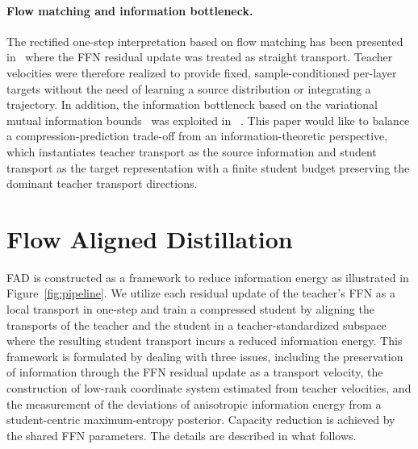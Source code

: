 \documentclass[letterpaper]{article} %
\theoremstyle{plain}
\theoremstyle{definition}
\begin{document}
\paragraph{Flow matching and information bottleneck.}
The rectified one-step {interpretation} based on flow matching has been presented in~\citep{chen2018neuralode,lipman2023flowmatching,liu2023rectified} where the FFN residual update was treated as straight transport. Teacher velocities were therefore realized to provide fixed, sample-conditioned per-layer targets without the need of learning a source distribution or integrating a trajectory. In addition, the information bottleneck based on the variational mutual information bounds~\citep{barber2003im,poole2019variational} was exploited in ~\citep{tishby2015deep,alemi2017vib}. This paper would like to balance a compression-prediction trade-off from an information-theoretic perspective, which instantiates teacher transport as the source information and student transport as the target representation with a finite student budget preserving the dominant teacher transport directions.

\section{Flow Aligned Distillation}
\label{sec:method}
FAD is constructed as a framework to reduce information energy as illustrated in Figure~\ref{fig:pipeline}. We utilize each residual update of the teacher's FFN as a local transport in one-step and train a compressed student by aligning the transports of the teacher and the student in a teacher-standardized subspace where the resulting student transport incurs a reduced {information energy}. This framework is formulated by dealing with three issues, including the preservation of information through the FFN residual update as a transport velocity, the construction of low-rank coordinate system estimated from teacher velocities, and the measurement of the deviations of anisotropic information energy from a student-centric maximum-entropy posterior. Capacity reduction is achieved by the shared FFN parameters. The details are described in what follows.

\end{document}
